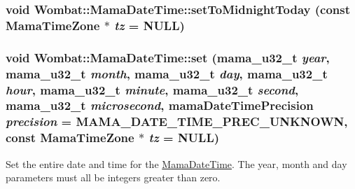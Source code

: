 \hypertarget{classWombat_1_1MamaDateTime_ad1c49cf313c23d347e458b789c24192b}{
\subsubsection[{setToMidnightToday}]{\setlength{\rightskip}{0pt plus 5cm}void Wombat::MamaDateTime::setToMidnightToday (const {\bf MamaTimeZone} $\ast$ {\em tz} = {\ttfamily NULL})}}
\label{classWombat_1_1MamaDateTime_ad1c49cf313c23d347e458b789c24192b}
\hypertarget{classWombat_1_1MamaDateTime_a0cefdc8f7306655701120a2c1bbda4ff}{
\subsubsection[{set}]{\setlength{\rightskip}{0pt plus 5cm}void Wombat::MamaDateTime::set (mama\_\-u32\_\-t {\em year}, \/  mama\_\-u32\_\-t {\em month}, \/  mama\_\-u32\_\-t {\em day}, \/  mama\_\-u32\_\-t {\em hour}, \/  mama\_\-u32\_\-t {\em minute}, \/  mama\_\-u32\_\-t {\em second}, \/  mama\_\-u32\_\-t {\em microsecond}, \/  mamaDateTimePrecision {\em precision} = {\ttfamily MAMA\_\-DATE\_\-TIME\_\-PREC\_\-UNKNOWN}, \/  const {\bf MamaTimeZone} $\ast$ {\em tz} = {\ttfamily NULL})}}
\label{classWombat_1_1MamaDateTime_a0cefdc8f7306655701120a2c1bbda4ff}


Set the entire date and time for the \hyperlink{classWombat_1_1MamaDateTime}{MamaDateTime}. The year, month and day parameters must all be integers greater than zero.


